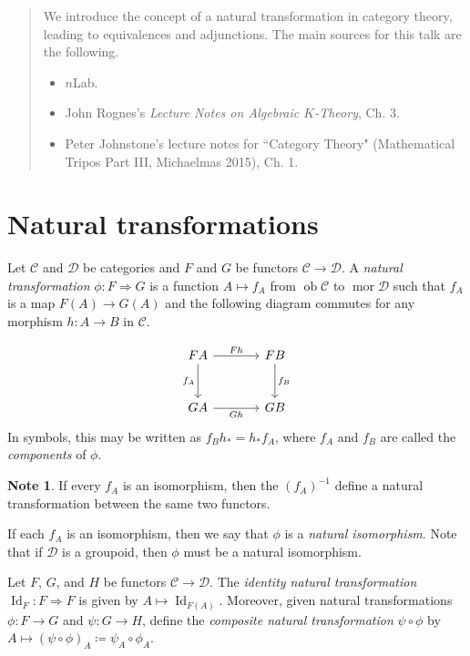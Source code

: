 \documentclass[10pt,letterpaper,cm]{nupset}
\theoremstyle{definition}
\newtheorem{note}[definition]{Note}
\theoremstyle{theorem}
\theoremstyle{remark}
\newcommand{\1}{\mathbf{1}}
\renewcommand{\c}{\mathscr{C}}
\renewcommand{\d}{\mathscr{D}}
\newcommand{\0}{\vec 0}
\DeclareMathOperator{\id}{Id}
\DeclareMathOperator{\ob}{ob}
\DeclareMathOperator{\mor}{mor}
\begin{document}
\begin{abstract}
We introduce the concept of a natural transformation in category theory, leading to equivalences and adjunctions. The main sources for this talk are the following.
\begin{itemize}
\item $n$Lab.
\item John Rognes's \textit{Lecture Notes on Algebraic $K$-Theory}, Ch. 3.
\item Peter Johnstone's lecture notes for ``Category Theory" (Mathematical Tripos Part III, Michaelmas 2015), Ch. 1.
\end{itemize}
\end{abstract}

\smallskip

\section{Natural transformations}


Let $\c$ and $\d$ be categories and $F$ and $G$ be functors $\c \to \d$.  A \textit{natural transformation} $\phi :F \Rightarrow G$  is a function $A \mapsto f_A$ from $\ob \c$ to $\mor \d$ such that $f_A$ is a map  $F(A) \to G(A)$ and the following diagram commutes for any morphism $h: A \to B$ in $\c$.

\[
\begin{tikzcd}[row sep=large, column sep = large]
FA \arrow[r, "F{h}"] \arrow[d, "f_A", swap]
& FB \arrow[d, "f_B"] \\
GA \arrow[r, "G{h}"']
& GB
\end{tikzcd}
\]
In symbols, this may be written as $f_Bh_{\ast} = h_{\ast}f_A$, where $f_A$ and $f_B$ are called the \textit{components} of $\phi$.


\begin{note}\label{rmk}
If every $f_A$ is an isomorphism, then the $\left(f_A\right)^{{-1}}$ define a natural transformation between the same two functors.
\end{note}

If each $f_A$ is an isomorphism, then we say that $\phi$ is a \textit{natural isomorphism}.
Note that if $\d$ is a groupoid, then $\phi$ must be a natural isomorphism.

\medskip

Let $F$, $G$, and $H$ be functors $\c \to \d$. The \textit{identity natural transformation} $\id_F : F \Rightarrow F$ is given by $A \mapsto \id_{F(A)}$. Moreover, given natural transformations $\phi: F \to G$ and $\psi: G \to H$, define the \textit{composite natural transformation} $\psi \circ \phi$ by $A \mapsto (\psi \circ \phi)_A \coloneqq \psi_{A} \circ \phi_{A}$.
\end{document}
